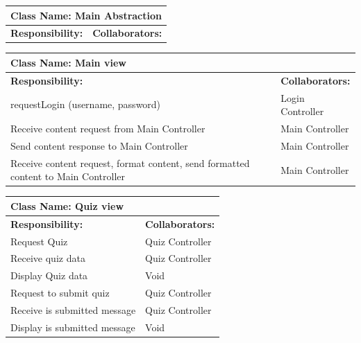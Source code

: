 \documentclass[]{article}
\begin{document}
	\begin{table}[H]
	\centering
		\begin{tabular}{|p{9cm}|p{3cm}|}
		\hline
		 \multicolumn{2}{|l|}{\textbf{Class Name: Main Abstraction}} \\
		\hline
		\textbf{Responsibility:} & \textbf{Collaborators:} \\
		\hline

		\end{tabular}
	\end{table}
	
	\begin{table}[H]
	\centering
		\begin{tabular}{|p{9cm}|p{3cm}|}
		\hline
		 \multicolumn{2}{|l|}{\textbf{Class Name: Main view}} \\
		\hline
		\textbf{Responsibility:} & \textbf{Collaborators:} \\
		\hline
	    requestLogin (username, password) & Login Controller\\
		\hline
		Receive content request from Main Controller & Main Controller\\
		\hline
		Send content response to Main Controller & Main Controller\\
		\hline
		Receive content request, format content, send formatted content to Main Controller & Main Controller \\
		\hline
		\end{tabular}
	\end{table}
	
	\begin{table}[H]
	\centering
		\begin{tabular}{|p{9cm}|p{3cm}|}
		\hline
		 \multicolumn{2}{|l|}{\textbf{Class Name: Quiz view}} \\
		\hline
		\textbf{Responsibility:} & \textbf{Collaborators:} \\
		\hline
		Request Quiz & Quiz Controller\\
		\hline
	    Receive quiz data & Quiz Controller\\
	    \hline
	    Display Quiz data & Void\\
	    \hline 
	    Request to submit quiz & Quiz Controller\\
	    \hline
	    Receive is submitted message & Quiz Controller\\
	    \hline
	    Display is submitted message & Void\\
	    \hline
		\end{tabular}
	\end{table}
	
\end{document}
